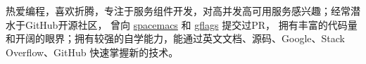 

\begin{cvparagraph}
  热爱编程，喜欢折腾，专注于服务组件开发，对高并发高可用服务感兴趣；经常潜水于GitHub开源社区，
  曾向 \href{https://github.com/syl20bnr/spacemacs/pull/10063}{spacemacs} 和
  \href{https://github.com/gflags/gflags/pull/239}{gflags} 提交过PR，
  拥有丰富的代码量和开阔的眼界；拥有较强的自学能力，能通过英文文档、源码、Google、Stack Overflow、GitHub 快速掌握新的技术。
\end{cvparagraph}

